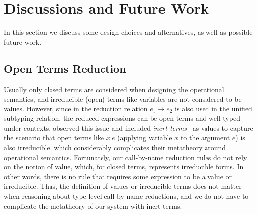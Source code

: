 \section{Discussions and Future Work}

In this section we discuss some design choices and alternatives, as well
as possible future work.

\subsection{Open Terms Reduction}
\label{sec:open-term-reduction}

Usually only closed terms are considered when designing the operational semantics,
and irreducible (open) terms like variables are not considered to be values.
However, since in \name the reduction relation $e_1 \longrightarrow e_2$ is also
used in the unified subtyping relation, the reduced expressions can be open terms and well-typed under contexts.
\citet{full} observed this issue and included \emph{inert terms}~\cite{opencbv} as values
to capture the scenario that open terms like $x~e$
(applying variable $x$ to the argument $e$) is also irreducible, which considerably
complicates their metatheory around operational semantics.
Fortunately, our call-by-name reduction rules do not rely on the notion of value,
which, for closed terms, represents irreducible forms. 
In other words, there is no rule that requires some expression to be a value or irreducible.
Thus, the definition of values or irreducible terms does not matter when reasoning about
type-level call-by-name reductions, and we do not have to complicate the metatheory of our system
with inert terms.


